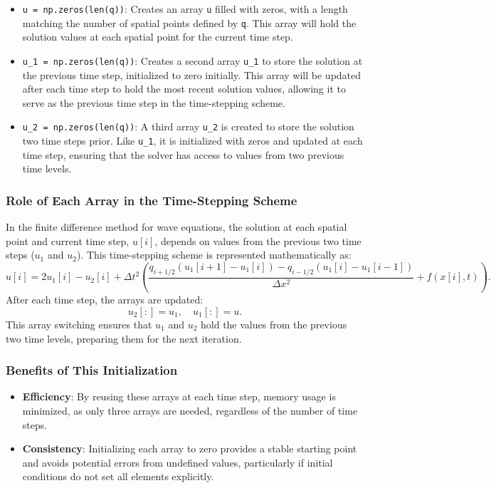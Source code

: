 \documentclass{article}
\begin{document}
			\begin{itemize}
				\item \texttt{u = np.zeros(len(q))}: Creates an array \texttt{u} filled with zeros, with a length matching the number of spatial points defined by \texttt{q}. This array will hold the solution values at each spatial point for the current time step.
				
				\item \texttt{u\_1 = np.zeros(len(q))}: Creates a second array \texttt{u\_1} to store the solution at the previous time step, initialized to zero initially. This array will be updated after each time step to hold the most recent solution values, allowing it to serve as the previous time step in the time-stepping scheme.
				
				\item \texttt{u\_2 = np.zeros(len(q))}: A third array \texttt{u\_2} is created to store the solution two time steps prior. Like \texttt{u\_1}, it is initialized with zeros and updated at each time step, ensuring that the solver has access to values from two previous time levels.
			\end{itemize}
			
			\subsubsection{Role of Each Array in the Time-Stepping Scheme}
			
			In the finite difference method for wave equations, the solution at each spatial point and current time step, \( u[i] \), depends on values from the previous two time steps (\( u_1 \) and \( u_2 \)). This time-stepping scheme is represented mathematically as:
			\[
			u[i] = 2 u_1[i] - u_2[i] + \Delta t^2 \left( \frac{q_{i+1/2} (u_1[i+1] - u_1[i]) - q_{i-1/2} (u_1[i] - u_1[i-1])}{\Delta x^2} + f(x[i], t) \right).
			\]
			After each time step, the arrays are updated:
			\[
			u_2[:] = u_1, \quad u_1[:] = u.
			\]
			This array switching ensures that \( u_1 \) and \( u_2 \) hold the values from the previous two time levels, preparing them for the next iteration.
			
			\subsubsection{Benefits of This Initialization}
			
			\begin{itemize}
				\item \textbf{Efficiency}: By reusing these arrays at each time step, memory usage is minimized, as only three arrays are needed, regardless of the number of time steps.
				\item \textbf{Consistency}: Initializing each array to zero provides a stable starting point and avoids potential errors from undefined values, particularly if initial conditions do not set all elements explicitly.
			\end{itemize}
			
\end{document}
